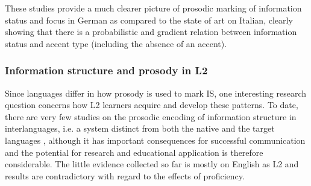 These studies provide a much clearer picture of prosodic marking of information status and focus in German as compared to the state of art on Italian, clearly showing that there is a probabilistic and gradient relation between information status and accent type (including the absence of an accent).

\subsubsection{Information structure and prosody in L2}
\hypertarget{Toc191305889}{}
Since languages differ in how prosody is used to mark IS, one interesting research question concerns how L2 learners acquire and develop these patterns. To date, there are very few studies on the prosodic encoding of information structure in interlanguages, i.e. a system distinct from both the native and the target languages \citep{Selinker1972}, although it has important consequences for successful communication and the potential for research and educational application is therefore considerable. The little evidence collected so far is mostly on English as L2 and results are contradictory with regard to the effects of proficiency.

